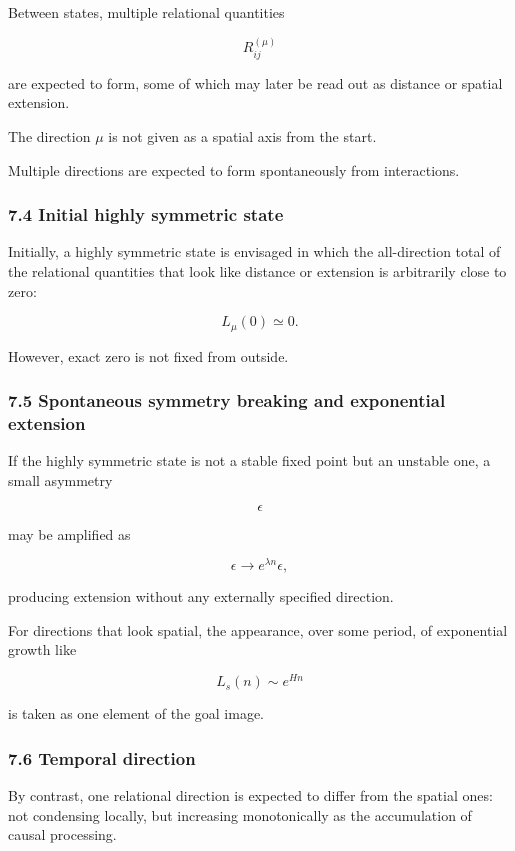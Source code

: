\documentclass[
  a4paper,
]{article}
\begin{document}
Between states, multiple relational quantities

\[
R_{ij}^{(\mu)}
\]

are expected to form, some of which may later be read out as distance or
spatial extension.

The direction \(\mu\) is not given as a spatial axis from the start.

Multiple directions are expected to form spontaneously from
interactions.

\subsubsection{7.4 Initial highly symmetric
state}\label{initial-highly-symmetric-state}

Initially, a highly symmetric state is envisaged in which the
all-direction total of the relational quantities that look like distance
or extension is arbitrarily close to zero:

\[
\boxed{
L_\mu(0)\simeq 0.
}
\]

However, exact zero is not fixed from outside.

\subsubsection{7.5 Spontaneous symmetry breaking and exponential
extension}\label{spontaneous-symmetry-breaking-and-exponential-extension}

If the highly symmetric state is not a stable fixed point but an
unstable one, a small asymmetry

\[
\epsilon
\]

may be amplified as

\[
\epsilon\rightarrow e^{\lambda n}\epsilon,
\]

producing extension without any externally specified direction.

For directions that look spatial, the appearance, over some period, of
exponential growth like

\[
\boxed{
L_s(n)\sim e^{Hn}
}
\]

is taken as one element of the goal image.

\subsubsection{7.6 Temporal direction}\label{temporal-direction}

By contrast, one relational direction is expected to differ from the
spatial ones: not condensing locally, but increasing monotonically as
the accumulation of causal processing.
\end{document}
